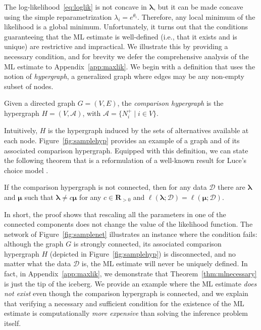 The log-likelihood~\eqref{eq:loglik} is not concave in $\bm{\lambda}$, but it can be made concave using the simple reparametrization $\lambda_i = e^{\theta_i}$.
Therefore, any local minimum of the likelihood is a global minimum.
Unfortunately, it turns out that the conditions guaranteeing that the ML estimate is well-defined (i.e., that it exists and is unique) are restrictive and impractical.
We illustrate this by providing a necessary condition, and for brevity we defer the comprehensive analysis of the ML estimate to Appendix~\ref{app:maxlik}.
We begin with a definition that uses the notion of \emph{hypergraph}, a generalized graph where edges may be any non-empty subset of nodes.
\begin{definition}
Given a directed graph $G = (V, E)$, the \emph{comparison hypergraph} is the hypergraph $H = (V, \mathcal{A})$, with $\mathcal{A} = \{ N^+_i \mid i \in V \}$.
\end{definition}
Intuitively, $H$ is the hypergraph induced by the sets of alternatives available at each node.
Figure~\ref{fig:samplehyp} provides an example of a graph and of its associated comparison hypergraph.
Equipped with this definition, we can state the following theorem that is a reformulation of a well-known result for Luce's choice model \citep{hunter2004mm}.
\begin{theorem}
\label{thm:mlnecessary}
If the comparison hypergraph is not connected, then for any data $\mathcal{D}$ there are $\bm{\lambda}$ and $\bm{\mu}$ such that $\bm{\lambda} \neq c \bm{\mu}$ for any $c \in \mathbf{R}_{>0}$ and $\ell(\bm{\lambda} ; \mathcal{D}) = \ell(\bm{\mu} ; \mathcal{D}).$
\end{theorem}
In short, the proof shows that rescaling all the parameters in one of the connected components does not change the value of the likelihood function.
The network of Figure~\ref{fig:samplenet} illustrates an instance where the condition fails:
although the graph $G$ is strongly connected, its associated comparison hypergraph $H$ (depicted in Figure~\ref{fig:samplehyp}) is disconnected, and no matter what the data $\mathcal{D}$ is, the ML estimate will never be uniquely defined.
In fact, in Appendix~\ref{app:maxlik}, we demonstrate that Theorem~\ref{thm:mlnecessary} is just the tip of the iceberg.
We provide an example where the ML estimate \emph{does not exist} even though the comparison hypergraph is connected, and we explain that verifying a necessary and sufficient condition for the existence of the ML estimate is computationally \emph{more expensive} than solving the inference problem itself.

